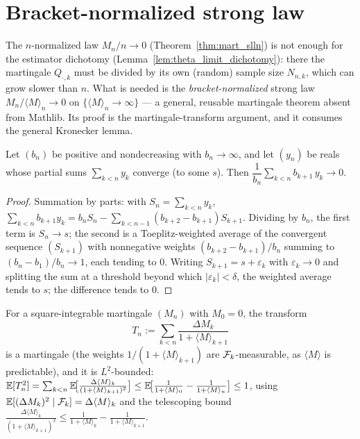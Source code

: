 \section{Bracket-normalized strong law}
\label{sec:pre_slln_bracket}

The $n$-normalized law $M_n/n\to0$ (Theorem~\ref{thm:mart_slln}) is not enough for the estimator
dichotomy (Lemma~\ref{lem:theta_limit_dichotomy}): there the martingale $Q_{\cdot,k}$ must be divided
by its own (random) sample size $N_{n,k}$, which can grow slower than $n$. What is needed is the
\emph{bracket-normalized} strong law $M_n/\langle M\rangle_n\to0$ on $\{\langle M\rangle_n\to\infty\}$
--- a general, reusable martingale theorem absent from Mathlib. Its proof is the martingale-transform
argument, and it consumes the general Kronecker lemma.

\begin{lemma}\label{lem:kronecker_general}
\leanok
Let $(b_n)$ be positive and nondecreasing with $b_n\to\infty$, and let $(y_n)$ be reals whose partial
sums $\sum_{k<n} y_k$ converge (to some $s$). Then $\dfrac1{b_n}\sum_{k<n} b_{k+1}\,y_k \to 0$.
\end{lemma}

\begin{proof}\leanok
Summation by parts: with $S_n=\sum_{k<n}y_k$,
$\sum_{k<n} b_{k+1}y_k = b_n S_n - \sum_{k<n-1}(b_{k+2}-b_{k+1})S_{k+1}$. Dividing by $b_n$, the first
term is $S_n\to s$; the second is a Toeplitz-weighted average of the convergent sequence
$(S_{k+1})$ with nonnegative weights $(b_{k+2}-b_{k+1})/b_n$ summing to $(b_n-b_1)/b_n\to1$, each
tending to $0$. Writing $S_{k+1}=s+\varepsilon_k$ with $\varepsilon_k\to0$ and splitting the sum at a
threshold beyond which $|\varepsilon_k|<\delta$, the weighted average tends to $s$; the difference
tends to $0$.
\end{proof}

\begin{lemma}\label{lem:slln_bracket_weighted}
\leanok
{}
For a square-integrable martingale $(M_n)$ with $M_0=0$, the transform
\[
  T_n := \sum_{k<n} \frac{\Delta M_k}{1+\langle M\rangle_{k+1}}
\]
is a martingale (the weights $1/(1+\langle M\rangle_{k+1})$ are $\mathcal{F}_k$-measurable, as
$\langle M\rangle$ is predictable), and it is $L^2$-bounded:
$\mathbb{E}[T_n^2] = \sum_{k<n} \mathbb{E}\!\big[\tfrac{\Delta\langle M\rangle_k}{(1+\langle M\rangle_{k+1})^2}\big]
\le \mathbb{E}\!\big[\tfrac1{1+\langle M\rangle_0}-\tfrac1{1+\langle M\rangle_n}\big] \le 1$,
using $\mathbb{E}[(\Delta M_k)^2\mid\mathcal{F}_k]=\Delta\langle M\rangle_k$ and the telescoping bound
$\tfrac{\Delta\langle M\rangle_k}{(1+\langle M\rangle_{k+1})^2}\le
\tfrac1{1+\langle M\rangle_k}-\tfrac1{1+\langle M\rangle_{k+1}}$.
\end{lemma}

